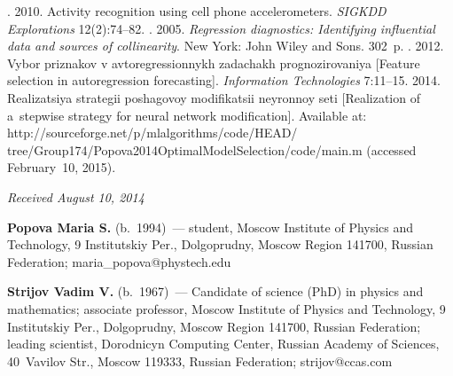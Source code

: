 \begin{multicols}{2}
{{\begin{thebibliography}{99}
.
2010. Activity recognition using cell phone accelerometers.
\textit{SIGKDD Explorations} 12(2):74--82.
.
2005. \textit{Regression diagnostics: Identifying influential data and sources of
collinearity}. New York: John Wiley and Sons. 302~p.
.
2012. Vybor priznakov v avtoregressionnykh zadachakh prognozirovaniya
[Feature selection in autoregression forecasting].
\textit{Information Technologies} 7:11--15.
2014. Realizatsiya strategii poshagovoy modifikatsii neyronnoy seti
[Realization of a~stepwise strategy for neural network modification].
Available at: {\sf
http://sourceforge.net/p/mlalgorithms/code/HEAD/
tree/Group174/Popova2014OptimalModelSelection/\linebreak code/main.m} (accessed February~10, 2015).
\end{thebibliography}

 }
 }

\end{multicols}

\vspace*{-3pt}

\hfill{\small\textit{Received August 10, 2014}}



\Contr

\noindent
\textbf{Popova Maria S.} (b.\ 1994)~--- student, Moscow Institute of Physics and Technology,
9 Institutskiy Per., Dolgoprudny, Moscow Region 141700, Russian Federation;
maria\_popova@phystech.edu

\vspace*{3pt}

\noindent
\textbf{Strijov Vadim V.} (b.\ 1967)~--- Candidate of science (PhD)
in physics and mathematics; associate professor,
Moscow Institute of Physics and Technology,
9 Institutskiy Per., Dolgoprudny, Moscow Region 141700, Russian Federation;
leading scientist, Dorodnicyn Computing Center, Russian Academy of Sciences,
40~Vavilov Str.,  Moscow 119333, Russian Federation;  strijov@ccas.com

\label{end\stat}

\renewcommand{\bibname}{\protect\rm Литература}